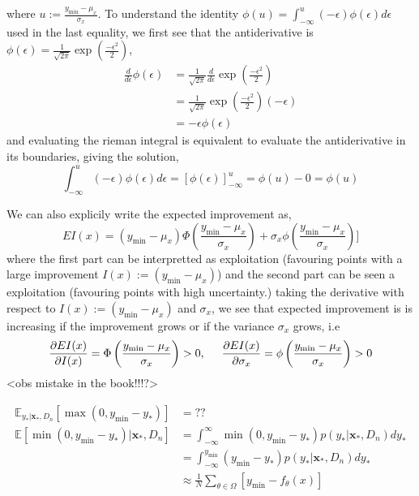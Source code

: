where $u:=\frac{y_{\min}-\mu_x}{\sigma_x}$. To understand the identity $\phi(u) = \int_{-\infty}^u
(-\epsilon)  \phi(\epsilon) d\epsilon$ used in the last equality, we first see that the antiderivative
is $\phi(\epsilon) = \frac{1}{\sqrt{2\pi}} \exp(\frac{-\epsilon^2}{2})$,
\begin{align*}
    \frac{d}{d \epsilon} \phi(\epsilon) &=  \frac{1}{\sqrt{2\pi}}\frac{d}{d \epsilon} \exp(\frac{-\epsilon^2}{2})\\
    &=  \frac{1}{\sqrt{2\pi}}\exp(\frac{-\epsilon^2}{2})(-\epsilon)\\
    &= -\epsilon \phi(\epsilon)
\end{align*}
and evaluating the rieman integral is equivalent to evaluate the antiderivative in its boundaries, giving the 
solution, 
$$\int_{-\infty}^u
(-\epsilon)  \phi(\epsilon) d\epsilon = \left[\phi(\epsilon)\right]_{-\infty}^u = \phi(u)-0 = \phi(u)$$ 

We can also explicily write the expected improvement as, 
$$EI(x) = (y_{\min}-\mu_x)\Phi\left(\frac{y_{\min}-\mu_x}{\sigma_x}\right)+ \sigma_x
\phi\left(\frac{y_{\min}-\mu_x}{\sigma_x}\right)]$$
where the first part can be interpretted as exploitation (favouring points with a large improvement $I(x) := (y_{\min}-\mu_x)$)
and the second part can be seen a exploitation (favouring points with high uncertainty.)
taking the derivative with respect to $I(x) := (y_{\min}-\mu_x)$ and $\sigma_x$, we see that expected improvement is 
is increasing if the improvement grows or if the variance $\sigma_x$ grows, i.e
$$\frac{\partial EI(x)}{\partial I(x)} = \Phi\left(\frac{y_{\min}-\mu_x}{\sigma_x}\right) > 0, \hspace*{0.5cm} 
\frac{\partial EI(x)}{\partial \sigma_x} = \phi\left(\frac{y_{\min}-\mu_x}{\sigma_x}\right) >0$$ 
<obs mistake in the book!!!?>





\begin{align*}
    \mathbb{E}_{y_*|\textbf{x}_*,D_n}[\max(0,y_{\min}-y_*)] &= ??\\
    \mathbb{E}[\min(0,y_{\min}-y_*)|\textbf{x}_*,D_n] &= \int_{-\infty}^\infty \min(0,y_{\min}-y_*) p(y_*|\textbf{x}_*,D_n) dy_*\\
    &= \int_{-\infty}^{y_{\min}} (y_{\min}-y_*) p(y_*|\textbf{x}_*,D_n) dy_*\\
    &\approx \frac{1}{N} \sum_{\theta \in \Omega } [y_{\min}-f_\theta(x)]
\end{align*}

